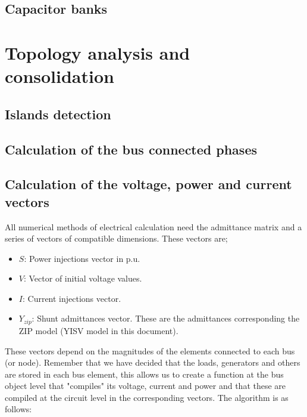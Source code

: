 \documentclass[nols,a4paper,twoside,notoc,fleqn]{tufte-book}
\begin{document}
\vspace{0.5cm}


\section{Capacitor banks}




\chapter{Topology analysis and consolidation}


\section{Islands detection}


\section{Calculation of the bus connected phases}


\section{Calculation of the voltage, power and current vectors}

All numerical methods of electrical calculation need the admittance matrix and a series of vectors of compatible dimensions. These vectors are;

\begin{itemize}
	\item $S$: Power injections vector in p.u.
	\item $V$: Vector of initial voltage values.
	\item $I$:  Current injections vector.
	\item $Y_{zip}$:  Shunt admittances vector. These are the admittances corresponding the ZIP model (YISV model in this document).
\end{itemize}


These vectors depend on the magnitudes of the elements connected to each bus (or node). Remember that we have decided that the loads, generators and others are stored in each bus element, this allows us to create a function at the bus object level that "compiles" its voltage, current and power and that these are compiled at the circuit level in the corresponding vectors.
The algorithm is as follows:
\end{document}

